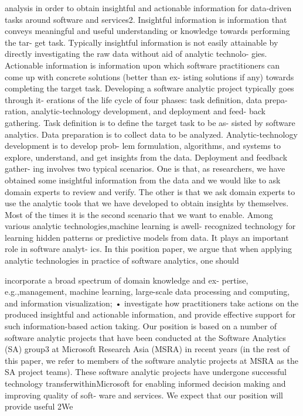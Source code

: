 \documentclass{llncs}
\begin{document}
analysis in order to obtain insightful and actionable information for data-driven tasks around software and services2. Insightful information is information that conveys meaningful
and useful understanding or knowledge towards performing the tar- get task. Typically insightful information is not easily attainable by directly investigating the raw data without aid of analytic technolo- gies. Actionable information is information upon which software practitioners can come up with concrete solutions (better than ex- isting solutions if any) towards completing the target task. Developing a software analytic project typically goes through it-
erations of the life cycle of four phases: task definition, data prepa- ration, analytic-technology development, and deployment and feed- back gathering. Task definition is to define the target task to be as- sisted by software analytics. Data preparation is to collect data to be analyzed. Analytic-technology development is to develop prob- lem formulation, algorithms, and systems to explore, understand, and get insights from the data. Deployment and feedback gather- ing involves two typical scenarios. One is that, as researchers, we have obtained some insightful information from the data and we would like to ask domain experts to review and verify. The other is that we ask domain experts to use the analytic tools that we have developed to obtain insights by themselves. Most of the times it is the second scenario that we want to enable. Among various analytic technologies,machine learning is awell-
recognized technology for learning hidden patterns or predictive models from data. It plays an important role in software analyt- ics. In this position paper, we argue that when applying analytic technologies in practice of software analytics, one should

incorporate a broad spectrum of domain knowledge and ex- pertise, e.g.,management, machine learning, large-scale data processing and computing, and information visualization;
• investigate how practitioners take actions on the produced insightful and actionable information, and provide effective support for such information-based action taking.
Our position is based on a number of software analytic projects
that have been conducted at the Software Analytics (SA) group3 at Microsoft Research Asia (MSRA) in recent years (in the rest of this paper, we refer to members of the software analytic projects at MSRA as the SA project teams). These software analytic projects have undergone successful technology transferwithinMicrosoft for enabling informed decision making and improving quality of soft- ware and services. We expect that our position will provide useful
2We
\end{document}

